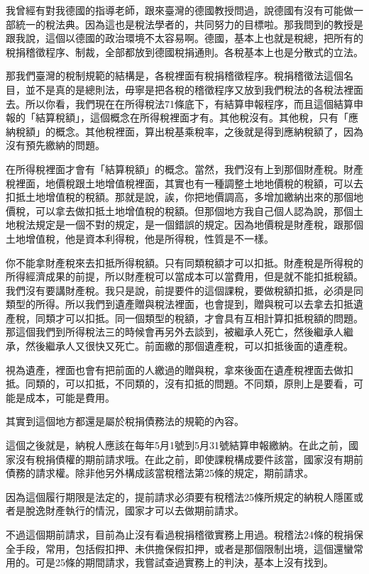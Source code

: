 \documentclass[]{ctexbook}
\begin{document}
我曾經有對我德國的指導老師，跟來臺灣的德國教授問過，說德國有沒有可能做一部統一的稅法典。因為這也是稅法學者的，共同努力的目標啦。那我問到的教授是跟我說，這個以德國的政治環境不太容易啊。德國，基本上也就是稅總，把所有的稅捐稽徵程序、制裁，全部都放到德國稅捐通則。各稅基本上也是分散式的立法。

那我們臺灣的稅制規範的結構是，各稅裡面有稅捐稽徵程序。稅捐稽徵法這個名目，並不是真的是總則法，毋寧是把各稅的稽徵程序又放到我們稅法的各稅法裡面去。所以你看，我們現在在所得稅法71條底下，有結算申報程序，而且這個結算申報的「結算稅額」，這個概念在所得稅裡面才有。其他稅沒有。其他稅，只有「應納稅額」的概念。其他稅裡面，算出稅基乘稅率，之後就是得到應納稅額了，因為沒有預先繳納的問題。

在所得稅裡面才會有「結算稅額」的概念。當然，我們沒有上到那個財產稅。財產稅裡面，地價稅跟土地增值稅裡面，其實也有一種調整土地地價稅的稅額，可以去扣抵土地增值稅的稅額。那就是說，誒，你把地價調高，多增加繳納出來的那個地價稅，可以拿去做扣抵土地增值稅的稅額。但那個地方我自己個人認為說，那個土地稅法規定是一個不對的規定，是一個錯誤的規定。因為地價稅是財產稅，跟那個土地增值稅，他是資本利得稅，他是所得稅，性質是不一樣。

你不能拿財產稅來去扣抵所得稅額。只有同類稅額才可以扣抵。財產稅是所得稅的所得經濟成果的前提，所以財產稅可以當成本可以當費用，但是就不能扣抵稅額。我們沒有要講財產稅。我只是說，前提要件的這個課稅，要做稅額扣抵，必須是同類型的所得。所以我們到遺產贈與稅法裡面，也會提到，贈與稅可以去拿去扣抵遺產稅，同類才可以扣抵。同一個類型的稅額，才會具有互相計算扣抵稅額的問題。那這個我們到所得稅法三的時候會再另外去談到，被繼承人死亡，然後繼承人繼承，然後繼承人又很快又死亡。前面繳的那個遺產稅，可以扣抵後面的遺產稅。

視為遺產，裡面也會有把前面的人繳過的贈與稅，拿來後面在遺產稅裡面去做扣抵。同類的，可以扣抵，不同類的，沒有扣抵的問題。不同類，原則上是要看，可能是成本，可能是費用。

其實到這個地方都還是屬於稅捐債務法的規範的內容。

這個之後就是，納稅人應該在每年5月1號到5月31號結算申報繳納。在此之前，國家沒有稅捐債權的期前請求哦。在此之前，即使課稅構成要件該當，國家沒有期前債務的請求權。除非他另外構成該當稅稽法第25條的規定，期前請求。

因為這個履行期限是法定的，提前請求必須要有稅稽法25條所規定的納稅人隱匿或者是脫逸財產執行的情況，國家才可以去做期前請求。

不過這個期前請求，目前為止沒有看過稅捐稽徵實務上用過。稅稽法24條的稅捐保全手段，常用，包括假扣押、未供擔保假扣押，或者是那個限制出境，這個還蠻常用的。可是25條的期間請求，我嘗試查過實務上的判決，基本上沒有找到。
\end{document}
